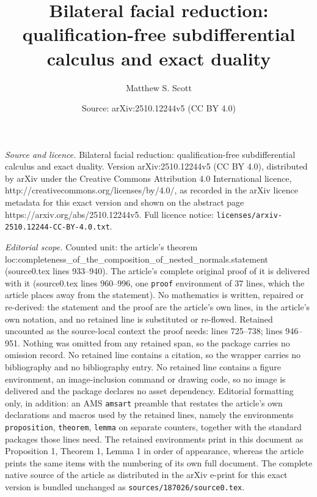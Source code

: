 \documentclass[10pt,a4paper]{amsart}
\title{Bilateral facial reduction: qualification-free subdifferential calculus and exact duality}
\author{Matthew S. Scott}
\date{Source: arXiv:2510.12244v5 (CC BY 4.0)}
\begin{document}
\maketitle

\noindent\emph{Source and licence.} Bilateral facial reduction: qualification-free subdifferential calculus and exact duality. Version arXiv:2510.12244v5 (CC BY 4.0), distributed by arXiv under the Creative Commons Attribution 4.0 International licence, http://creativecommons.org/licenses/by/4.0/, as recorded in the arXiv licence metadata for this exact version and shown on the abstract page https://arxiv.org/abs/2510.12244v5. Full licence notice: \texttt{licenses/arxiv-2510.12244-CC-BY-4.0.txt}.\par\smallskip

\noindent\textit{Editorial scope.} Counted unit: the article's theorem loc:completeness\_of\_the\_composition\_of\_nested\_normals.statement (source0.tex lines 933--940). The article's complete original proof of it is delivered with it (source0.tex lines 960--996, one \texttt{proof} environment of 37 lines, which the article places away from the statement). No mathematics is written, repaired or re-derived: the statement and the proof are the article's own lines, in the article's own notation, and no retained line is substituted or re-flowed.  Retained uncounted as the source-local context the proof needs: lines 725--738; lines 946--951.  Nothing was omitted from any retained span, so the package carries no omission record.  No retained line contains a citation, so the wrapper carries no bibliography and no bibliography entry.  No retained line contains a figure environment, an image-inclusion command or drawing code, so no image is delivered and the package declares no asset dependency.  Editorial formatting only, in addition: an AMS \texttt{amsart} preamble that restates the article's own declarations and macros used by the retained lines, namely the environments \texttt{proposition}, \texttt{theorem}, \texttt{lemma} on separate counters, together with the standard packages those lines need.  The retained environments print in this document as Proposition 1, Theorem 1, Lemma 1 in order of appearance, whereas the article prints the same items with the numbering of its own full document.  The complete native source of the article as distributed in the arXiv e-print for this exact version is bundled unchanged as \texttt{sources/187026/source0.tex}.
\end{document}
